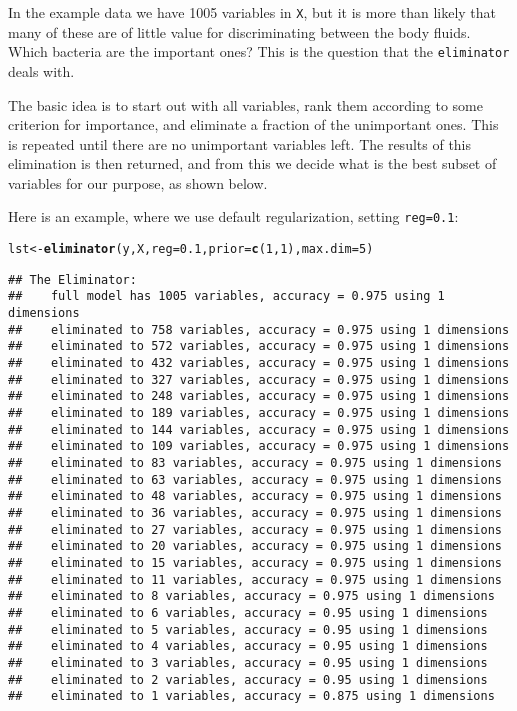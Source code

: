 \documentclass[a4paper]{article}\usepackage[]{graphicx}\usepackage[]{color}
\makeatletter
\newcommand{\hlnum}[1]{\textcolor[rgb]{0.686,0.059,0.569}{#1}}%
\newcommand{\hlstd}[1]{\textcolor[rgb]{0.345,0.345,0.345}{#1}}%
\newcommand{\hlkwb}[1]{\textcolor[rgb]{0.69,0.353,0.396}{#1}}%
\newcommand{\hlkwc}[1]{\textcolor[rgb]{0.333,0.667,0.333}{#1}}%
\newcommand{\hlkwd}[1]{\textcolor[rgb]{0.737,0.353,0.396}{\textbf{#1}}}%
\newenvironment{kframe}{%
 \def\at@end@of@kframe{}%
 \ifinner\ifhmode%
  \def\at@end@of@kframe{\end{minipage}}%
  \begin{minipage}{\columnwidth}%
 \fi\fi%
 \def\FrameCommand##1{\hskip\@totalleftmargin \hskip-\fboxsep
 \colorbox{shadecolor}{##1}\hskip-\fboxsep
     \hskip-\linewidth \hskip-\@totalleftmargin \hskip\columnwidth}%
 \MakeFramed {\advance\hsize-\width
   \@totalleftmargin\z@ \linewidth\hsize
   \@setminipage}}%
 {\par\unskip\endMakeFramed%
 \at@end@of@kframe}
\newenvironment{knitrout}{}{} %
\makeatother
\begin{document}
In the example data we have 1005 variables in \texttt{X}, but it is more than likely that many of these are of little value for discriminating between the body fluids. Which bacteria are the important ones? This is the question that the \texttt{eliminator} deals with.

The basic idea is to start out with all variables, rank them according to some criterion for importance, and eliminate a fraction of the unimportant ones. This is repeated until there are no unimportant variables left. The results of this elimination is then returned, and from this we decide what is the best subset of variables for our purpose, as shown below.

Here is an example, where we use default regularization, setting \texttt{reg=0.1}:
\begin{knitrout}
\color{fgcolor}\begin{kframe}
\begin{alltt}
\hlstd{lst} \hlkwb{<-} \hlkwd{eliminator}\hlstd{(y,X,}\hlkwc{reg}\hlstd{=}\hlnum{0.1}\hlstd{,}\hlkwc{prior}\hlstd{=}\hlkwd{c}\hlstd{(}\hlnum{1}\hlstd{,}\hlnum{1}\hlstd{),}\hlkwc{max.dim}\hlstd{=}\hlnum{5}\hlstd{)}
\end{alltt}
\begin{verbatim}
## The Eliminator:
##    full model has 1005 variables, accuracy = 0.975 using 1 dimensions
##    eliminated to 758 variables, accuracy = 0.975 using 1 dimensions
##    eliminated to 572 variables, accuracy = 0.975 using 1 dimensions
##    eliminated to 432 variables, accuracy = 0.975 using 1 dimensions
##    eliminated to 327 variables, accuracy = 0.975 using 1 dimensions
##    eliminated to 248 variables, accuracy = 0.975 using 1 dimensions
##    eliminated to 189 variables, accuracy = 0.975 using 1 dimensions
##    eliminated to 144 variables, accuracy = 0.975 using 1 dimensions
##    eliminated to 109 variables, accuracy = 0.975 using 1 dimensions
##    eliminated to 83 variables, accuracy = 0.975 using 1 dimensions
##    eliminated to 63 variables, accuracy = 0.975 using 1 dimensions
##    eliminated to 48 variables, accuracy = 0.975 using 1 dimensions
##    eliminated to 36 variables, accuracy = 0.975 using 1 dimensions
##    eliminated to 27 variables, accuracy = 0.975 using 1 dimensions
##    eliminated to 20 variables, accuracy = 0.975 using 1 dimensions
##    eliminated to 15 variables, accuracy = 0.975 using 1 dimensions
##    eliminated to 11 variables, accuracy = 0.975 using 1 dimensions
##    eliminated to 8 variables, accuracy = 0.975 using 1 dimensions
##    eliminated to 6 variables, accuracy = 0.95 using 1 dimensions
##    eliminated to 5 variables, accuracy = 0.95 using 1 dimensions
##    eliminated to 4 variables, accuracy = 0.95 using 1 dimensions
##    eliminated to 3 variables, accuracy = 0.95 using 1 dimensions
##    eliminated to 2 variables, accuracy = 0.95 using 1 dimensions
##    eliminated to 1 variables, accuracy = 0.875 using 1 dimensions
\end{verbatim}
\end{kframe}
\end{knitrout}
\end{document}
